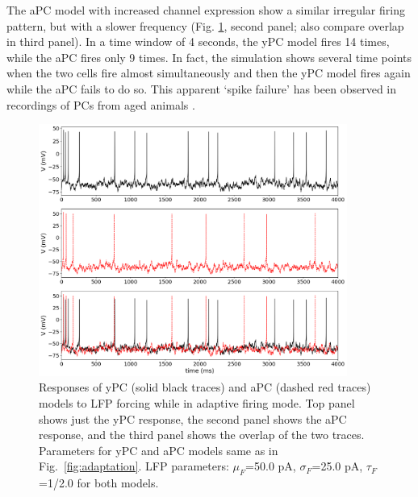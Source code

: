 \documentclass[12pt]{article}
\begin{document}
The aPC model with increased {\Ca} channel expression show a similar irregular firing pattern, but with a slower frequency  (Fig. \ref{fig:LFPadaptive}, second panel; also compare overlap in third panel). In a time window of 4 seconds, the yPC model fires 14 times, while the aPC fires only 9 times. In fact, the simulation shows several time points when the two cells fire almost simultaneously and then the yPC model fires again while the aPC fails to do so. This apparent `spike failure' has been observed in recordings of PCs from aged animals \citep{gant2009action}. 
\begin{figure}[h!]
\centering
\includegraphics[width=0.9\textwidth]{figures/fig7.png}
\caption{Responses of yPC (solid black traces) and aPC (dashed red traces) models to LFP forcing while in adaptive firing mode. Top panel shows just the yPC response, the second panel shows the aPC response, and the third panel shows the overlap of the two traces. Parameters for yPC and aPC models same as in Fig.~\ref{fig:adaptation}. LFP parameters: $\mu_{F}$=50.0 pA, $\sigma_{F}$=25.0 pA, $\tau_{F}$=1/2.0 for both models.}
\label{fig:LFPadaptive}
\end{figure}
\end{document}
